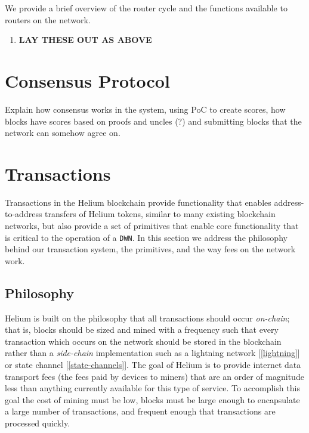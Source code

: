\documentclass[letterpaper,11pt]{article}
\begin{document}
We provide a brief overview of the router cycle and the functions available to routers on the network.

\begin{enumerate}
  \item \textbf{LAY THESE OUT AS ABOVE}
\end{enumerate}

\newpage

\section{Consensus Protocol} \label{consensus}

Explain how consensus works in the system, using PoC to create scores, how blocks have scores based on proofs and uncles (?) and submitting blocks that the network can somehow agree on.

\newpage

\section{Transactions} \label{transactions}

Transactions in the Helium blockchain provide functionality that enables address-to-address transfers of Helium tokens, similar to many existing blockchain networks, but also provide a set of primitives that enable core functionality that is critical to the operation of a \verb|DWN|. In this section we address the philosophy behind our transaction system, the primitives, and the way fees on the network work.

\subsection{Philosophy}

Helium is built on the philosophy that all transactions should occur \textit{on-chain}; that is, blocks should be sized and mined with a frequency such that every transaction which occurs on the network should be stored in the blockchain rather than a \textit{side-chain} implementation such as a lightning network [\ref{lightning}] or state channel [\ref{state-channels}]. The goal of Helium is to provide internet data transport fees (the fees paid by devices to miners) that are an order of magnitude less than anything currently available for this type of service. To accomplish this goal the cost of mining must be low, blocks must be large enough to encapsulate a large number of transactions, and frequent enough that transactions are processed quickly.\newline
\end{document}
